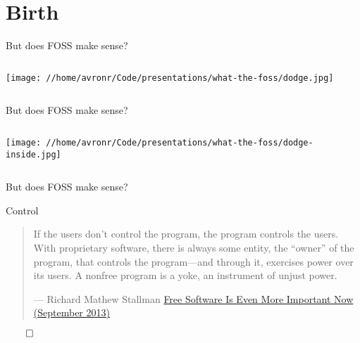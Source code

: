 \documentclass[presentation]{beamer}
\begin{document}
\section*{Birth}
\label{sec:orgf21c517}
\begin{frame}[label={sec:orgc546918}]{But does FOSS make sense?}
\begin{columns}
\begin{column}{0.6\columnwidth}
\begin{example}
\begin{center}
\texttt{[image: //home/avronr/Code/presentations/what-the-foss/dodge.jpg]}
\end{center}
\end{example}
\end{column}
\end{columns}
\end{frame}
\begin{frame}[label={sec:org1426e28}]{But does FOSS make sense?}
\begin{columns}
\begin{column}{0.6\columnwidth}
\begin{example}
\begin{center}
\texttt{[image: //home/avronr/Code/presentations/what-the-foss/dodge-inside.jpg]}
\end{center}
\end{example}
\end{column}
\end{columns}
\end{frame}
\begin{frame}[label={sec:orgcbd0c27}]{But does FOSS make sense?}
\begin{block}{Control}
\begin{quote}
If the users don't control the program, the program controls the users. With proprietary software, there is always some entity, the ``owner'' of the program, that controls the program—and through it, exercises power over its users. A nonfree program is a yoke, an instrument of unjust power.

--- Richard Mathew Stallman \href{https://www.gnu.org/philosophy/free-software-even-more-important.html}{Free Software Is Even More Important Now (September 2013)}
\end{quote}
\hfill \(\qed\)
\end{block}
\end{frame}
\end{document}

